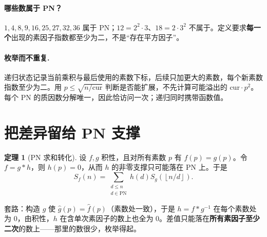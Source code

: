 \documentclass[UTF8,a4paper,11pt,twoside,openright,fontset=fandol]{ctexbook}
\theoremstyle{definition}
\newtheorem{theorem}[definition]{定理}
\newcommand{\floor}[1]{\left\lfloor #1\right\rfloor}
\begin{document}
\paragraph{哪些数属于 PN？}
$1,4,8,9,16,25,27,32,36$ 属于 PN；$12=2^2\cdot3$、$18=2\cdot3^2$ 不属于。定义要求\textbf{每一个}出现的素因子指数都至少为二，不是“存在平方因子”。
\paragraph{枚举而不重复.} 递归状态记录当前乘积与最后使用的素数下标，后续只加更大的素数，每个新素数指数至少为二。用 $p\le\sqrt{n/\text{cur}}$ 判断是否能扩展，不先计算可能溢出的 $\text{cur}\cdot p^2$。每个 PN 的质因数分解唯一，因此恰访问一次；递归同时携带函数值。


\section{把差异留给 PN 支撑}
\begin{theorem}[PN 求和转化]
设 $f,g$ 积性，且对所有素数 $p$ 有 $f(p)=g(p)$。令 $f=g*h$，则 $h(p)=0$，从而 $h$ 的非零支撑只可能落在 PN 上。于是
\[
 S_f(n)=\sum_{\substack{d\le n\\d\in\mathrm{PN}}}h(d)S_g(\floor{n/d}).
\]
\end{theorem}

\begin{tip}
套路：构造 $g$ 使 $\hat g(p)=\hat f(p)$（素数处一致），于是 $h=f*g^{-1}$ 在每个素数处为 $0$，由积性，$h$ 在含单次素因子的数上也全为 $0$。差值只能落在\textbf{所有素因子至少二次}的数上——那里的数很少，枚举得起。
\end{tip}
\end{document}
